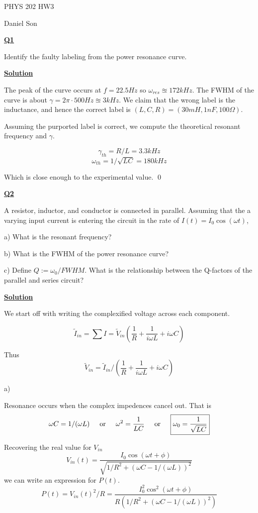 \documentclass{article}
\newcommand{\new}[1]{
    \vspace{2mm}
    \noindent
    \textbf{
    \underline{#1}}
}
\newcommand{\textOr}{
    {
        \hspace{5mm}
        \textrm{or}
        \hspace{5mm}
    }
}
\begin{document}
\begin{center}
\LARGE
PHYS 202 HW3

\Large
Daniel Son
\end{center}

\normalsize

\new{Q1}
Identify the faulty labeling from the power 
resonance curve. 

\new{Solution}

The peak of the curve occurs 
at $f = 22.5Hz$ so 
$\omega_{res} \approxeq 172kHz$. The FWHM of the 
curve is about $\gamma  = 2\pi \cdot 500Hz
\approxeq 3kHz $. We claim that the 
wrong label is the inductance, and hence 
the correct label is 
$(L, C, R) = (30mH, 1nF, 100 \Omega)$. 

Assuming the purported label is correct, 
we compute the theoretical resonant frequency 
and $\gamma$. 

\[
    \gamma_{th} = R/L = 3.3kHz
\]
\[
    \omega_{th} = 1/\sqrt{LC} = 180kHz
\]

Which is close enough to the experimental 
value. \hfill \qed 


\new{Q2}
A resistor, inductor, and conductor 
is connected in parallel. Assuming 
that the a varying input current is 
entering the circuit in the rate of 
$I(t)  = I_0 \cos(\omega t)$, 

a) What is the resonant frequency?

b) What is the FWHM of the power resonance curve?

c) Define $Q:= \omega_0/FWHM$. What is the 
relationship between the Q-factors 
of the parallel and series circuit?

\new{Solution}

We start off with writing the complexified 
voltage across each component. 

\[
    \tilde{I}_{in} = \sum I = 
    \tilde{V}_{in} \left( 
        \frac{1}{R} +
        \frac{1}{i\omega L} +
        i\omega C
    \right)
\]

Thus 
\[
    \tilde{V}_{in} = \tilde{I}_{in} / \left( 
        \frac{1}{R} +
        \frac{1}{i\omega L} +
        i\omega C
    \right)
\]

a)

Resonance occurs when  the complex impedences 
cancel out. That is 
\[
    \omega C = 1/(\omega L)
    \textOr 
    \omega ^2 = \frac{1}{LC}
    \textOr 
    \boxed{
    \omega_0  = \frac{1}{\sqrt{LC}
    }
    }
\]

Recovering the real value for $V_{in}$
\[
    V_{in}(t) = \frac{
        I_0 \cos(\omega t + \phi )
    }{
        \sqrt{
        1/R^2 + (\omega C - 1/(\omega L))^2
        }
    }
\]
we can write an expression for $P(t)$.
\[
    P(t) = V_{in}(t)^2/R = 
\frac{
        I_0^2 \cos^2(\omega t + \phi )
    }{
        R(
        1/R^2 + (\omega C - 1/(\omega L))^2
        )
    }
\]
\end{document}
